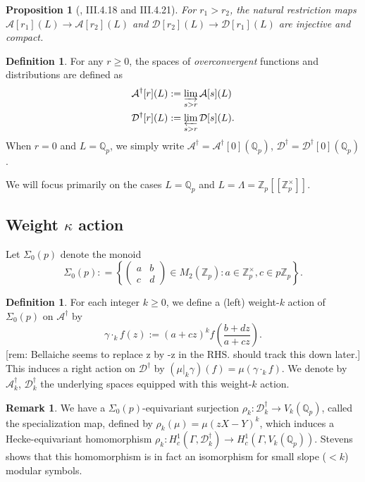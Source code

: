 \documentclass[10pt]{amsart}
\theoremstyle{plain}
\newtheorem{proposition}[theorem]{Proposition}
\theoremstyle{definition}
\newtheorem{definition}[theorem]{Definition}
\newtheorem{remark}[theorem]{Remark}
\newcommand{\ZZ}{{\mathbb{Z}}}
\newcommand{\QQ}{{\mathbb{Q}}}
\newcommand{\cA}{\mathcal{A}}
\newcommand{\cD}{\mathcal{D}}
\begin{document}
\begin{proposition}[\cite{Bellaiche}, III.4.18 and III.4.21] For $r_1> r_2$, the natural restriction maps $\cA[r_1](L)\rightarrow \cA[r_2](L)$  and $\cD[r_2](L)\rightarrow \cD[r_1](L)$ are injective and compact.
\end{proposition}

\begin{definition}
For any $r\geq 0$, the spaces of \emph{overconvergent} functions and distributions are defined as
\begin{align}
	\cA^\dagger[r](L) &:= \varinjlim_{s>r} \cA[s](L)\\
	\cD^\dagger[r](L) &:=\varprojlim_{s>r} \cD[s](L).
\end{align}
When $r=0$ and $L=\QQ_p$, we simply write $\cA^\dagger = \cA^\dagger[0](\QQ_p)$, $\cD^\dagger = \cD^\dagger[0](\QQ_p)$.
\end{definition}
We will focus primarily on the cases $L=\QQ_p$ and $L=\Lambda = \ZZ_p[[\ZZ_p^\times]]$.

\subsection{Weight $\kappa$ action}
Let $\Sigma_0(p)$ denote the monoid
\begin{equation*}
	\Sigma_0(p) : = \left\{ \begin{pmatrix} a & b \\ c & d\end{pmatrix}\in M_2(\ZZ_p) : a\in \ZZ_p^\times, c\in p\ZZ_p\right\}.
\end{equation*}

\begin{definition}
For each integer $k\geq 0$, we define a (left) weight-$k$ action of $\Sigma_0(p)$ on $\cA^\dagger$ by 
\begin{equation}
	\gamma \cdot_k f(z) := (a+cz)^k f\left(\frac{b+dz}{a+cz}\right).
\end{equation}
[rem: Bellaiche seems to replace z by -z in the RHS. should track this down later.]
This induces a right action on $\cD^\dagger$ by $(\mu|_k\gamma) (f) = \mu(\gamma\cdot_k f)$. We denote by $\cA_k^\dagger$, $\cD_k^\dagger$ the underlying spaces equipped with this weight-$k$ action.
\end{definition}

\begin{remark}
We have a $\Sigma_0(p)$-equivariant surjection $\rho_k : \cD_k^\dagger\rightarrow V_k(\QQ_p)$, called the specialization map, defined by $\rho_k(\mu) = \mu( zX-Y)^k$, which induces a Hecke-equivariant homomorphism $\rho_k : H_c^1(\Gamma, \cD^\dagger_k)\rightarrow H^1_c (\Gamma, V_k(\QQ_p))$. Stevens shows \cite{Stevens} that this homomorphism is in fact an isomorphism for small slope ($<k$) modular symbols. 
\end{remark}
\end{document}
